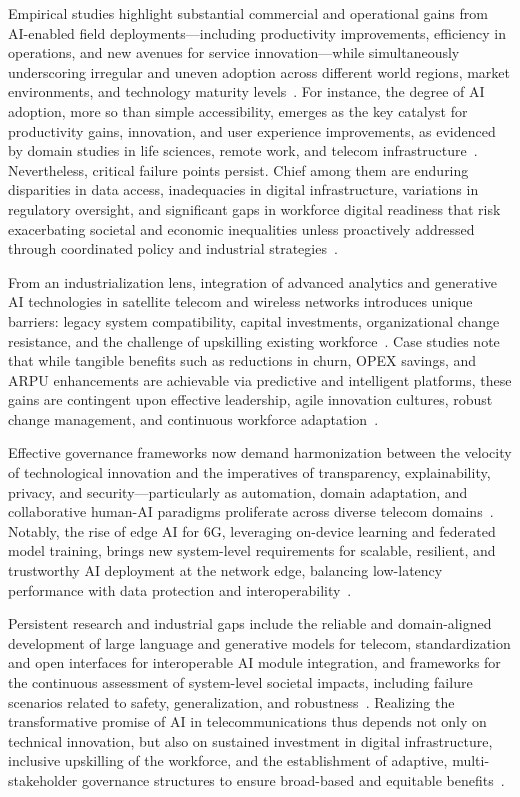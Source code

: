 \documentclass[sigconf]{acmart}
\begin{document}
Empirical studies highlight substantial commercial and operational gains from AI-enabled field deployments—including productivity improvements, efficiency in operations, and new avenues for service innovation—while simultaneously underscoring irregular and uneven adoption across different world regions, market environments, and technology maturity levels~\cite{ref6, ref8, ref29}. For instance, the degree of AI adoption, more so than simple accessibility, emerges as the key catalyst for productivity gains, innovation, and user experience improvements, as evidenced by domain studies in life sciences, remote work, and telecom infrastructure~\cite{ref6, ref8, ref19}. Nevertheless, critical failure points persist. Chief among them are enduring disparities in data access, inadequacies in digital infrastructure, variations in regulatory oversight, and significant gaps in workforce digital readiness that risk exacerbating societal and economic inequalities unless proactively addressed through coordinated policy and industrial strategies~\cite{ref8, ref19}.

From an industrialization lens, integration of advanced analytics and generative AI technologies in satellite telecom and wireless networks introduces unique barriers: legacy system compatibility, capital investments, organizational change resistance, and the challenge of upskilling existing workforce~\cite{ref19, ref26}. Case studies note that while tangible benefits such as reductions in churn, OPEX savings, and ARPU enhancements are achievable via predictive and intelligent platforms, these gains are contingent upon effective leadership, agile innovation cultures, robust change management, and continuous workforce adaptation~\cite{ref19}.

Effective governance frameworks now demand harmonization between the velocity of technological innovation and the imperatives of transparency, explainability, privacy, and security—particularly as automation, domain adaptation, and collaborative human-AI paradigms proliferate across diverse telecom domains~\cite{ref19, ref26, ref49}. Notably, the rise of edge AI for 6G, leveraging on-device learning and federated model training, brings new system-level requirements for scalable, resilient, and trustworthy AI deployment at the network edge, balancing low-latency performance with data protection and interoperability~\cite{ref49}.

Persistent research and industrial gaps include the reliable and domain-aligned development of large language and generative models for telecom, standardization and open interfaces for interoperable AI module integration, and frameworks for the continuous assessment of system-level societal impacts, including failure scenarios related to safety, generalization, and robustness~\cite{ref19, ref26, ref49}. Realizing the transformative promise of AI in telecommunications thus depends not only on technical innovation, but also on sustained investment in digital infrastructure, inclusive upskilling of the workforce, and the establishment of adaptive, multi-stakeholder governance structures to ensure broad-based and equitable benefits~\cite{ref8, ref19, ref26, ref29, ref49}.
\end{document}
